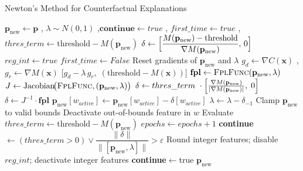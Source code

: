 \documentclass[12pt]{extarticle}
\numberwithin{equation}{section}
\begin{document}
\begin{algorithm}
    \caption{Newton's Method for Counterfactual Explanations}
\label{alg:newton_counterfactual}
\begin{algorithmic}[1]
     {} 
    \State $\mathbf{p}_{\text{new}} \gets \mathbf{p}$
    ,\; $\lambda \sim N(0, 1)$
    ,\;$\mathbf{continue} \gets true$
    ,\; $first\_time \gets true$
    ,\; $thres\_term \gets \text{threshold} - M(\mathbf{p}_{\text{new}})$
         
            \State $\delta \gets 
                \Bigl[\dfrac{M(\mathbf{p}_{\text{new}})
                        -\text{threshold}}
                    {\nabla M(\mathbf{p}_{\text{new}})} ,\,0\Bigr]$
        \Else
             
                \State $reg\_int \gets true$
                \State $first\_time \gets False$
            \EndIf
            \State Reset gradients of $\mathbf{p}_{\text{new}}$ and $\lambda$
             {}
                \State $g_{d} \gets \nabla C(\mathbf{x})$
                ,\;$g_{r} \gets \nabla M(\mathbf{x})$
                \State \Return $\bigl[g_{d}-\lambda\,g_{r},\;(\text{threshold}-M(\mathbf{x}))\bigr]$
            \EndFunction
            \State $\mathbf{fpl} \gets \textsc{FplFunc}(\mathbf{p}_{\text{new}},\lambda)$
            \State $J \gets \text{Jacobian}\!\bigl(\textsc{FplFunc},
                                (\mathbf{p}_{\text{new}},\lambda)\bigr)$
            \label{lst:line_norm} 
                \State $\delta \gets thres\_term\ \cdot
                        \Bigl[\frac{\nabla M(\mathbf{p}_{\text{new}})}{|\nabla M(\mathbf{p}_{\text{new}})|},\;0\Bigr]$
            \Else
                \State $\delta \gets J^{-1} \cdot \mathbf{fpl}$ 
            \EndIf
        \EndIf
        \State $\mathbf{p}_{\text{new}}[w_{active}] \gets 
                \mathbf{p}_{\text{new}}[w_{active}]- \delta[w_{active}] $
        \State $\lambda \gets \lambda - \delta_{-1}$
            \State Clamp $\mathbf{p}_{\text{new}}$ to valid bounds 
            \State Deactivate out-of-bounds feature in $w$
        \EndIf
        \State Evaluate $thres\_term \gets \text{threshold}-M(\mathbf{p}_{\text{new}})$
        \State $epochs \gets epochs+1$
        \State \textbf{continue} $\gets (thres\_term>0)\lor
                \dfrac{\lVert\delta\rVert}{\lVert[\mathbf{p}_{\text{new}},\lambda]\rVert}>\varepsilon$
            \State Round integer features;\; disable $reg\_int$;\; deactivate integer features
            \State \textbf{continue}$\gets$true
        \EndIf
    \EndWhile
    \State \Return $\mathbf{p}_{\text{new}}$
    \EndFunction
\end{algorithmic}
\end{algorithm}
\end{document}

